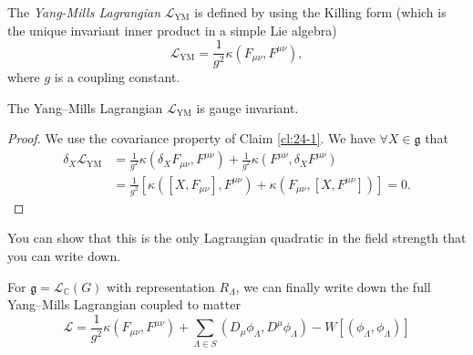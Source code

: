 \begin{definition}[]
  The \emph{Yang-Mills Lagrangian} $\mathcal{L}_{\text{YM}}$  is defined by using the Killing form (which is the unique invariant inner product in a simple Lie algebra)
  \begin{equation}
    \mathcal{L}_{\text{YM}} = \frac{1}{g^2} \kappa(F_{\mu\nu}, F^{\mu\nu}),
  \end{equation}
  where $g$ is a coupling constant.
\end{definition}
\begin{claim}
   The Yang--Mills Lagrangian $\mathcal{L}_{\text{YM}}$ is gauge invariant.
\end{claim}
\begin{proof}
  We use the covariance property of Claim \ref{cl:24-1}.  We have $\forall X \in \mathfrak{g}$ that
  \begin{align}
    \delta_X \mathcal{L}_{\text{YM}} &= \frac{1}{g^2} \kappa (\delta_X F_{\mu\nu}, F^{\mu\nu}) + \frac{1}{g^2} \kappa(F^{\mu\nu}, \delta_X F^{\mu\nu}) \\
			   &= \frac{1}{g^2} [\kappa([X, F_{\mu\nu}], F^{\mu\nu}) + \kappa(F_{\mu\nu}, [X, F^{\mu\nu}])] = 0.
  \end{align}
\end{proof}

\begin{remark}
  You can show that this is the only Lagrangian quadratic in the field strength that you can write down.
\end{remark}

For $\mathfrak{g} = \mathscr{L}_{\mathbb{C}}(G)$ with representation $R_{\Lambda}$, we can finally write down the full Yang--Mills Lagrangian coupled to matter
\begin{equation}
  \mathcal{L} = \frac{1}{g^2} \kappa (F_{\mu\nu}, F^{\mu\nu}) + \sum_{\Lambda \in S} (D_{\mu} \phi_{\Lambda}, D^{\mu} \phi_{\Lambda}) - W[(\phi_{\Lambda}, \phi_{\Lambda})]
\end{equation}
